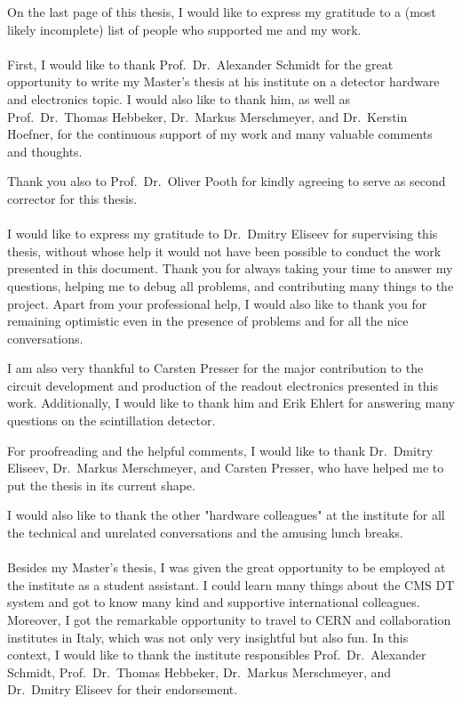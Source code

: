 

On the last page of this thesis, I would like to express my gratitude to a (most likely incomplete) list of people who supported me and my work.
\\ \\
First, I would like to thank Prof.\ Dr.\ Alexander Schmidt for the great opportunity to write my Master's thesis at his institute on a detector hardware and electronics topic. I would also like to thank him, as well as Prof.\ Dr.\ Thomas Hebbeker, Dr.\ Markus Merschmeyer, and Dr.\ Kerstin Hoefner, for the continuous support of my work and many valuable comments and thoughts.
\par Thank you also to Prof.\ Dr.\ Oliver Pooth for kindly agreeing to serve as second corrector for this thesis.
\\ \\
I would like to express my gratitude to Dr.\ Dmitry Eliseev for supervising this thesis, without whose help it would not have been possible to conduct the work presented in this document. Thank you for always taking your time to answer my questions, helping me to debug all problems, and contributing many things to the project. Apart from your professional help, I would also like to thank you for remaining optimistic even in the presence of problems and for all the nice conversations.
\par I am also very thankful to Carsten Presser for the major contribution to the circuit development and production of the readout electronics presented in this work. Additionally, I would like to thank him and Erik Ehlert for answering many questions on the scintillation detector.
\par For proofreading and the helpful comments, I would like to thank Dr.\ Dmitry Eliseev, Dr.\ Markus Merschmeyer, and Carsten Presser, who have helped me to put the thesis in its current shape.
\par I would also like to thank the other "hardware colleagues" at the institute for all the technical and unrelated conversations and the amusing lunch breaks.
\\ \\
Besides my Master's thesis, I was given the great opportunity to be employed at the institute as a student assistant. I could learn many things about the \ac{CMS} \ac{DT} system and got to know many kind and supportive international colleagues. Moreover, I got the remarkable opportunity to travel to \acs{CERN} and collaboration institutes in Italy, which was not only very insightful but also fun. In this context, I would like to thank the institute responsibles Prof.\ Dr.\ Alexander Schmidt, Prof.\ Dr.\ Thomas Hebbeker, Dr.\ Markus Merschmeyer, and Dr.\ Dmitry Eliseev for their endorsement.
